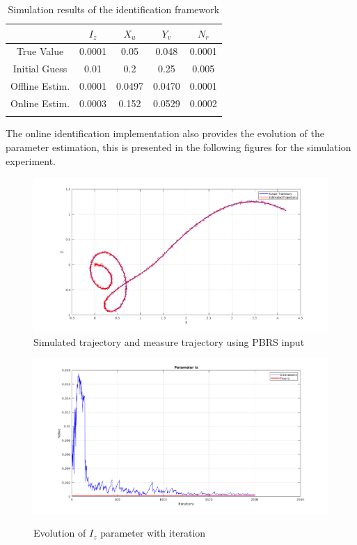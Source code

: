 \documentclass[12pt,titlepage]{article}
\begin{document}
\begin{center}
\begin{longtable}[c]{|c|c|c|c|c|}
\hline \rowcolor{gray!30}
 & $I_z$ & $X_u$ & $Y_v$ & $N_r$ \\ \hline
\endfirsthead
\endhead
True Value & 0.0001 & 0.05 & 0.048 & 0.0001  \\ \hline
Initial Guess & 0.01 & 0.2 & 0.25 & 0.005 \\ \hline
Offline Estim. & 0.0001 & 0.0497 & 0.0470 & 0.0001 \\ \hline
Online Estim. & 0.0003 & 0.152 & 0.0529 & 0.0002 \\ \hline
\caption{Simulation results of the identification framework}
\label{simResults}
\end{longtable}
\end{center}

The online identification implementation also provides the evolution of the parameter estimation, this is presented in the following figures for the simulation experiment. 
\begin{figure}[H]
\begin{minipage}{.5\textwidth}
  \centering
    \includegraphics[width=0.9\columnwidth]{Images/state_estimate.png}\\
    \caption{Simulated trajectory and measure trajectory using PBRS input}
    \label{fig:ukf_traj_sim}
    \end{minipage}%
\begin{minipage}{.5\textwidth}
  \centering
    \includegraphics[width=0.9\columnwidth]{Images/Iz_param_plot.png}\\
    \caption{Evolution of $I_z$ parameter with iteration}
    \label{fig:ukf_Iz_sim}
    \end{minipage}%
\end{figure}
\end{document}
